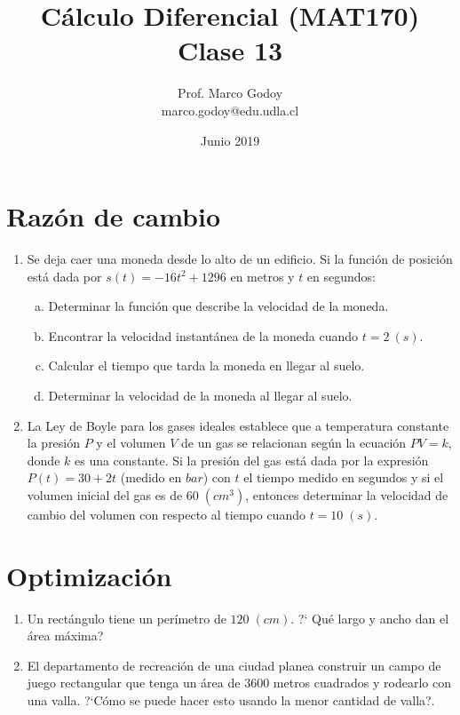 \documentclass[10pt]{article}
\title{C\'alculo Diferencial (MAT170)\\ Clase 13 }
\author{Prof. Marco Godoy\\
marco.godoy@edu.udla.cl}
\date{Junio 2019}
\newcommand{\2}[1]{\hspace{-0.93cm}\colorbox{color1}{\hspace{0.07cm} \parbox{17cm}{\vspace{0.2cm} #1}\hspace*{0.07cm} }}
\newcommand{\3}[1]{\hspace{-0.93cm}\colorbox{color7}{\hspace{0.07cm} \parbox{17cm}{\vspace{0.2cm} #1}\hspace*{0.07cm} }}
\theoremstyle{theorem}
\numberwithin{equation}{section}
\begin{document}
\maketitle

\section{Raz\'on de cambio}

\begin{enumerate}[1.]
    \item Se deja caer una moneda desde lo alto de un edificio. Si la funci\'on de posici\'on est\'a dada por $s(t)=-16t^2+1296$ en metros y $t$ en segundos:
    \begin{enumerate}[a.]
      \item Determinar la funci\'on que describe la velocidad de la moneda.
      \item Encontrar la velocidad instant\'anea de la moneda cuando $t=2\ (s)$.
      \item Calcular el tiempo que tarda la moneda en llegar al suelo.
      \item Determinar la velocidad de la moneda al llegar al suelo.
    \end{enumerate}   
    \item La Ley de Boyle para los gases ideales establece que a temperatura constante la presi\'on $P$ y el volumen $V$ de un gas se relacionan seg\'un la ecuaci\'on $PV=k$, donde $k$ es una constante. Si la presi\'on del gas est\'a dada por la expresi\'on $P(t)=30+2t$ (medido en $bar$) con $t$ el tiempo medido en segundos y si el volumen inicial del gas es de $60 \;(cm^3)$, entonces determinar la velocidad de cambio del volumen con respecto al tiempo cuando $t=10\; (s)$.
       
\end{enumerate}

\section{Optimizaci\'on}

\begin{enumerate}[1.]
 \item Un rect\'angulo tiene un per\'imetro de $120\; (cm)$. ?` Qu\'e largo y ancho dan el \'area m\'axima?
 \item El departamento de recreaci\'on de una ciudad planea construir un campo de juego rectangular que tenga un \'area de $3600$ metros cuadrados y rodearlo con una valla. ?`C\'omo se puede hacer esto usando la menor cantidad de valla?. 
\end{enumerate}
\end{document}
